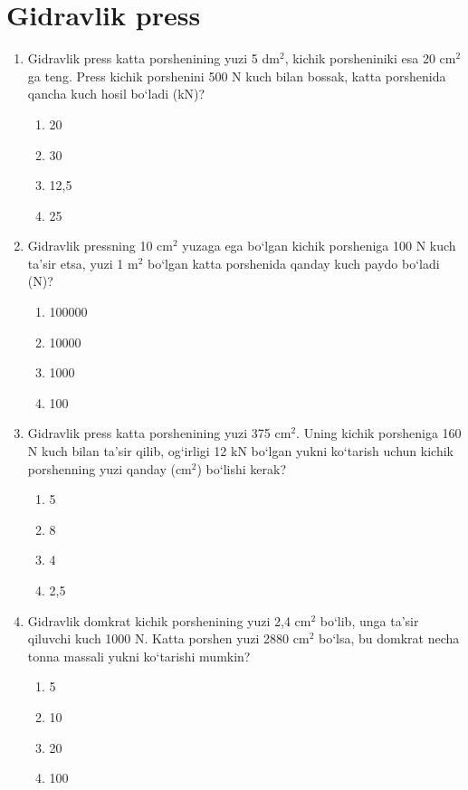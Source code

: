 \section{Gidravlik press}



\begin{enumerate}
\item Gidravlik press katta porshenining yuzi 5 dm$^2$, 
kichik porsheniniki esa 20 cm$^2$ ga teng. 
Press kichik porshenini 500 N kuch bilan bossak, 
katta porshenida qancha kuch hosil bo‘ladi (kN)?

\begin{enumerate}[label=\Alph*)]
\item 20
\item 30
\item 12,5
\item 25
\end{enumerate}


\item Gidravlik pressning 10 cm$^2$ yuzaga ega bo‘lgan kichik porsheniga 
100 N kuch ta’sir etsa, yuzi 1 m$^2$ bo‘lgan katta porshenida 
qanday kuch paydo bo‘ladi (N)?

\begin{enumerate}[label=\Alph*)]
\item 100000
\item 10000
\item 1000
\item 100
\end{enumerate}


\item Gidravlik press katta porshenining yuzi 375 cm$^2$. 
Uning kichik porsheniga 160 N kuch bilan ta’sir qilib, 
og‘irligi 12 kN bo‘lgan yukni ko‘tarish uchun 
kichik porshenning yuzi qanday (cm$^2$) bo‘lishi kerak?

\begin{enumerate}[label=\Alph*)]
\item 5
\item 8
\item 4
\item 2,5
\end{enumerate}


\item Gidravlik domkrat kichik porshenining yuzi 2,4 cm$^2$ bo‘lib, 
unga ta’sir qiluvchi kuch 1000 N. 
Katta porshen yuzi 2880 cm$^2$ bo‘lsa, bu domkrat 
necha tonna massali yukni ko‘tarishi mumkin?

\begin{enumerate}[label=\Alph*)]
\item 5
\item 10
\item 20
\item 100
\end{enumerate}



\end{enumerate}
